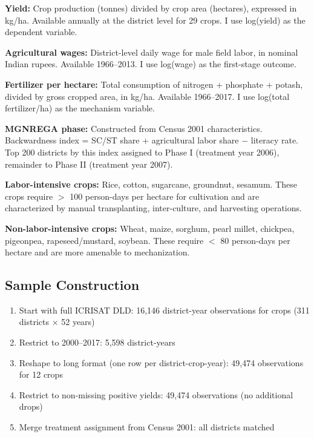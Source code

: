 \documentclass[12pt]{article}
\begin{document}
\textbf{Yield:} Crop production (tonnes) divided by crop area (hectares), expressed in kg/ha. Available annually at the district level for 29 crops. I use log(yield) as the dependent variable.

\textbf{Agricultural wages:} District-level daily wage for male field labor, in nominal Indian rupees. Available 1966--2013. I use log(wage) as the first-stage outcome.

\textbf{Fertilizer per hectare:} Total consumption of nitrogen + phosphate + potash, divided by gross cropped area, in kg/ha. Available 1966--2017. I use log(total fertilizer/ha) as the mechanism variable.

\textbf{MGNREGA phase:} Constructed from Census 2001 characteristics. Backwardness index = SC/ST share + agricultural labor share $-$ literacy rate. Top 200 districts by this index assigned to Phase I (treatment year 2006), remainder to Phase II (treatment year 2007).

\textbf{Labor-intensive crops:} Rice, cotton, sugarcane, groundnut, sesamum. These crops require $>$ 100 person-days per hectare for cultivation and are characterized by manual transplanting, inter-culture, and harvesting operations.

\textbf{Non-labor-intensive crops:} Wheat, maize, sorghum, pearl millet, chickpea, pigeonpea, rapeseed/mustard, soybean. These require $<$ 80 person-days per hectare and are more amenable to mechanization.

\subsection{Sample Construction}

\begin{enumerate}
    \item Start with full ICRISAT DLD: 16,146 district-year observations for crops (311 districts $\times$ 52 years)
    \item Restrict to 2000--2017: 5,598 district-years
    \item Reshape to long format (one row per district-crop-year): 49,474 observations for 12 crops
    \item Restrict to non-missing positive yields: 49,474 observations (no additional drops)
    \item Merge treatment assignment from Census 2001: all districts matched
\end{enumerate}


\end{document}
